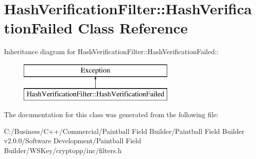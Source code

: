 \hypertarget{class_hash_verification_filter_1_1_hash_verification_failed}{
\section{HashVerificationFilter::HashVerificationFailed Class Reference}
\label{class_hash_verification_filter_1_1_hash_verification_failed}
}
Inheritance diagram for HashVerificationFilter::HashVerificationFailed::\begin{figure}[H]
\begin{center}
\leavevmode
\includegraphics[height=2cm]{class_hash_verification_filter_1_1_hash_verification_failed}
\end{center}
\end{figure}


The documentation for this class was generated from the following file:\begin{DoxyCompactItemize}
\item 
C:/Business/C++/Commercial/Paintball Field Builder/Paintball Field Builder v2.0.0/Software Development/Paintball Field Builder/WSKey/cryptopp/inc/filters.h\end{DoxyCompactItemize}
